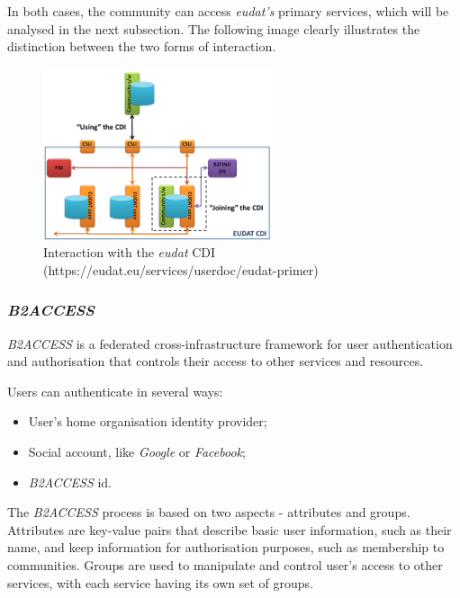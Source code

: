 In both cases, the community can access \textit{\gls{eudat}'s} primary services, which will be analysed in the next subsection. The following image clearly illustrates the distinction between the two forms of interaction.
  
\begin{figure}[!h]
    \centering
    \includegraphics[width=0.6\textwidth]{img/state_of_the_art/use_or_join.png}
    \caption{Interaction with the \textit{\gls{eudat}} CDI (https://eudat.eu/services/userdoc/eudat-primer)}
\end{figure}
  
\newpage
  
\subsubsection{\textit{B2ACCESS}}
  
\label{tab:b2access}  
  
\textit{B2ACCESS} is a federated cross-infrastructure framework for user authentication and authorisation that controls their access to other services and resources.
  
Users can authenticate in several ways: 
  
\begin{itemize}
    \item User's home organisation identity provider;
    \item Social account, like \textit{Google} or \textit{Facebook};
    \item \textit{B2ACCESS} id.
\end{itemize}
  
The \textit{B2ACCESS} process is based on two  aspects - attributes and groups. Attributes are key-value pairs that describe basic user information, such as their name, and keep information for authorisation purposes, such as membership to communities. Groups are used to manipulate and control user's access to other services, with each service having its own set of groups.
  
